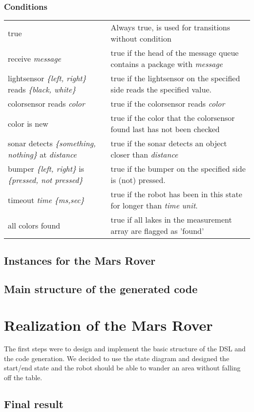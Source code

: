 \documentclass[11pt,a4paper]{article}
\begin{document}
\subsubsection{Conditions}
\begin{tabular}{p{6cm}p{10cm}}
true & Always true, is used for transitions without condition\\
receive \emph{message} & true if the head of the message queue contains a package with \emph{message}\\
lightsensor \emph{\{left, right\}} reads \emph{\{black, white\}} & true if the lightsensor on the specified side reads the specified value.\\
colorsensor reads \emph{color} & true if the colorsensor reads \emph{color}\\
color is new & true if the color that the colorsensor found last has not been checked\\
sonar detects \emph{\{something, nothing\}} at \emph{distance} & true if the sonar detects an object closer than \emph{distance}\\
bumper \emph{\{left, right\}} is \emph{\{pressed, not pressed\}} & true if the bumper on the specified side is (not) pressed.\\
timeout \emph{time} \emph{\{ms,sec\}} & true if the robot has been in this state for longer than \emph{time} \emph{unit}.\\
all colors found & true if all lakes in the measurement array are flagged as 'found'\\
\end{tabular}

\subsection*{Instances for the Mars Rover}

\subsection*{Main structure of the generated code}

\section*{Realization of the Mars Rover}
The first steps were to design and implement the basic structure of the DSL and the code generation. We decided to use the state diagram and designed the start/end state and the robot should be able to wander an area without falling off the table. 

\subsection*{Final result}
\end{document}
